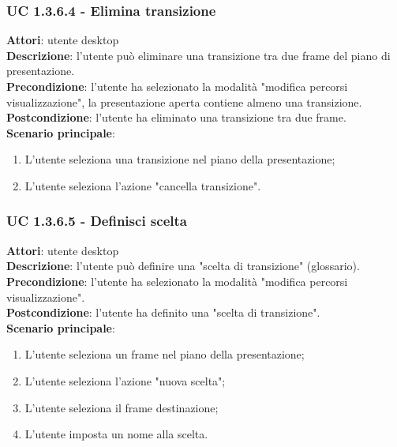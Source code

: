 \subsubsection{UC 1.3.6.4 - Elimina transizione}{
	\label{uc1.3.6.4}
	\textbf{Attori}: utente desktop \\
	\textbf{Descrizione}: l'utente può eliminare una transizione tra due frame del piano di presentazione. \\
	\textbf{Precondizione}: l'utente ha selezionato la modalità "modifica percorsi visualizzazione", la presentazione aperta contiene almeno una transizione.	\\
	\textbf{Postcondizione}: l'utente ha eliminato una transizione tra due frame.	\\
	\textbf{Scenario principale}:
	\begin{enumerate}
		\item L'utente seleziona una transizione nel piano della presentazione;
		\item L'utente seleziona l'azione "cancella transizione".
	\end{enumerate}
}
\subsubsection{UC 1.3.6.5 - Definisci scelta}{
	\label{uc1.3.6.5}
	\textbf{Attori}: utente desktop \\
	\textbf{Descrizione}: l'utente può definire una "scelta di transizione" (glossario). \\
	\textbf{Precondizione}: l'utente ha selezionato la modalità "modifica percorsi visualizzazione".	\\
	\textbf{Postcondizione}: l'utente ha definito una "scelta di transizione".	\\
	\textbf{Scenario principale}:
	\begin{enumerate}
		\item L'utente seleziona un frame nel piano della presentazione;
		\item L'utente seleziona l'azione "nuova scelta";
		\item L'utente seleziona il frame destinazione;
		\item L'utente imposta un nome alla scelta.
	\end{enumerate}
}
